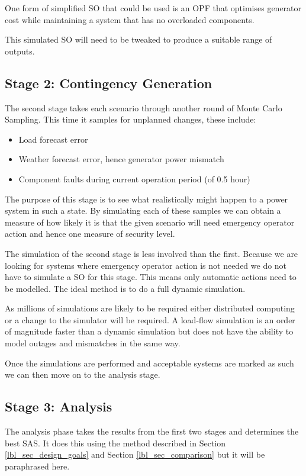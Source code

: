 \documentclass[a4paper,oneside,12pt]{report}
\begin{document}
One form of simplified SO that could be used is an OPF that optimises generator cost while maintaining a system that has no overloaded components.

This simulated SO will need to be tweaked to produce a suitable range of outputs.

\subsection{Stage 2: Contingency Generation}

The second stage takes each scenario through another round of Monte Carlo Sampling. This time it samples for unplanned changes, these include:

\begin{itemize}
  \item Load forecast error
  \item Weather forecast error, hence generator power mismatch
  \item Component faults during current operation period (of 0.5 hour)
\end{itemize}

The purpose of this stage is to see what realistically might happen to a power system in such a state. By simulating each of these samples we can obtain a measure of how likely it is that the given scenario will need emergency operator action and hence one measure of security level.

The simulation of the second stage is less involved than the first. Because we are looking for systems where emergency operator action is not needed we do not have to simulate a SO for this stage. This means only automatic actions need to be modelled. The ideal method is to do a full dynamic simulation.

As millions of simulations are likely to be required either distributed computing or a change to the simulator will be required. A load-flow simulation is an order of magnitude faster than a dynamic simulation but does not have the ability to model outages and mismatches in the same way.

Once the simulations are performed and acceptable systems are marked as such we can then move on to the analysis stage.

\subsection{Stage 3: Analysis}

The analysis phase takes the results from the first two stages and determines the best SAS. It does this using the method described in Section \ref{lbl_sec_design_goals} and Section \ref{lbl_sec_comparison} but it will be paraphrased here.
\end{document}

